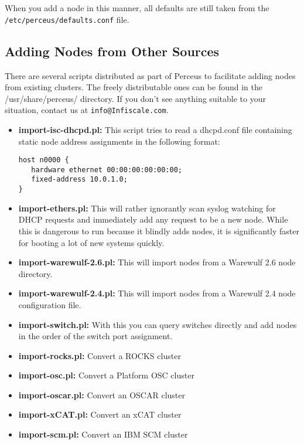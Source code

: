 \documentclass[10pt,letterpaper]{report}
\begin{document}
When you add a node in this manner, all defaults are still taken from the {\tt
/etc/perceus/defaults.conf} file.


\subsection{Adding Nodes from Other Sources}

There are several scripts distributed as part of Perceus to facilitate adding
nodes from existing clusters.  The freely distributable ones can be found in
the /usr/share/perceus/ directory.  If you don't see anything suitable to your
situation, contact us at {\tt info@Infiscale.com}.

\begin{itemize}

\item {\bf import-isc-dhcpd.pl:}  This script tries to read a dhcpd.conf file
containing static node address assignments in the following format:

\begin{verbatim}
host n0000 {
   hardware ethernet 00:00:00:00:00:00;
   fixed-address 10.0.1.0;
}
\end{verbatim}

\item {\bf import-ethers.pl:}  This will rather ignorantly scan syslog
watching for DHCP requests and immediately add any request to be a new
node.  While this is dangerous to run because it blindly adds nodes, it is
significantly faster for booting a lot of new systems quickly.

\item {\bf import-warewulf-2.6.pl:}  This will import nodes from a Warewulf
2.6 node directory.

\item {\bf import-warewulf-2.4.pl:}  This will import nodes from a Warewulf
2.4 node configuration file.

\item {\bf import-switch.pl:}  With this you can query switches directly and
add nodes in the order of the switch port assignment.

\item {\bf import-rocks.pl:}  Convert a ROCKS cluster

\item {\bf import-osc.pl:}  Convert a Platform OSC cluster

\item {\bf import-oscar.pl:}  Convert an OSCAR cluster

\item {\bf import-xCAT.pl:}  Convert an xCAT cluster

\item {\bf import-scm.pl:}  Convert an IBM SCM cluster

\end{itemize}
\end{document}
